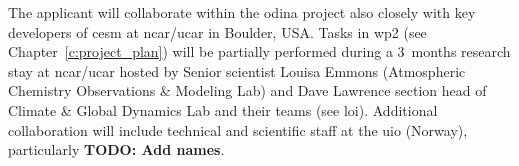 The applicant will collaborate within the \gls{odina} project also closely with key developers of \gls{cesm} at \gls{ncar}/\gls{ucar} in Boulder, USA. Tasks in \gls{wp}2 (see Chapter~\ref{c:project_plan}) will be partially performed during a 3~months research stay at \gls{ncar}/\gls{ucar} hosted by Senior scientist Louisa Emmons (Atmospheric Chemistry Observations \& Modeling Lab) and Dave Lawrence section head of Climate \& Global Dynamics Lab and their teams (see \gls{loi}). Additional collaboration will include technical and scientific staff at the \gls{uio} (Norway), particularly \textbf{\color{red}TODO: Add names}. 
